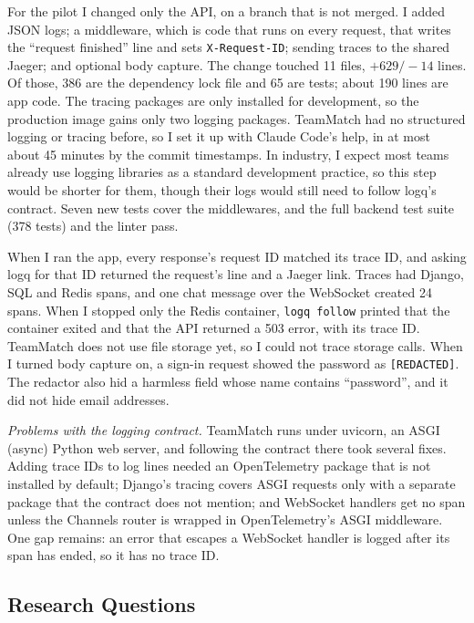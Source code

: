 \documentclass[10pt,conference]{IEEEtran}
\newcommand{\cmd}[1]{\texttt{#1}}
\begin{document}
For the pilot I changed only the API, on a branch that is not merged. I added JSON logs; a middleware, which is code that runs on every request, that writes the ``request finished'' line and sets \cmd{X-Request-ID}; sending traces to the shared Jaeger; and optional body capture. The change touched 11 files, $+629/-14$ lines. Of those, 386 are the dependency lock file and 65 are tests; about 190 lines are app code. The tracing packages are only installed for development, so the production image gains only two logging packages. TeamMatch had no structured logging or tracing before, so I set it up with Claude Code's help, in at most about 45 minutes by the commit timestamps. In industry, I expect most teams already use logging libraries as a standard development practice, so this step would be shorter for them, though their logs would still need to follow logq's contract. Seven new tests cover the middlewares, and the full backend test suite (378 tests) and the linter pass.

When I ran the app, every response's request ID matched its trace ID, and asking logq for that ID returned the request's line and a Jaeger link. Traces had Django, SQL and Redis spans, and one chat message over the WebSocket created 24 spans. When I stopped only the Redis container, \cmd{logq follow} printed that the container exited and that the API returned a 503 error, with its trace ID. TeamMatch does not use file storage yet, so I could not trace storage calls. When I turned body capture on, a sign-in request showed the password as \cmd{[REDACTED]}. The redactor also hid a harmless field whose name contains ``password'', and it did not hide email addresses.

\emph{Problems with the logging contract.} TeamMatch runs under uvicorn, an ASGI (async) Python web server, and following the contract there took several fixes. Adding trace IDs to log lines needed an OpenTelemetry package that is not installed by default; Django's tracing covers ASGI requests only with a separate package that the contract does not mention; and WebSocket handlers get no span unless the Channels router is wrapped in OpenTelemetry's ASGI middleware. One gap remains: an error that escapes a WebSocket handler is logged after its span has ended, so it has no trace ID.

\subsection{Research Questions}
\end{document}
